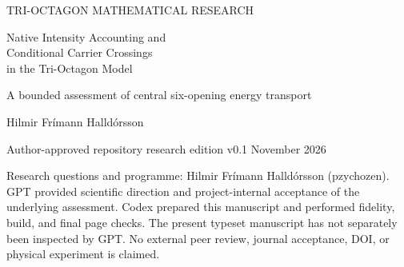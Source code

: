 \documentclass[11pt,a4paper]{article}
\numberwithin{equation}{section}
\theoremstyle{remark}\newtheorem{remark}[proposition]{Remark}
\begin{document}
\hypersetup{pageanchor=false}
\begin{titlepage}
\vspace*{6mm}
{\small\color{MidnightBlue} TRI-OCTAGON MATHEMATICAL RESEARCH\par}
\vspace{8mm}
{\LARGE\bfseries\raggedright Native Intensity Accounting and\\ Conditional Carrier Crossings\\ in the Tri-Octagon Model\par}
\vspace{6mm}
{\large A bounded assessment of central six-opening energy transport\par}
\vspace{7mm}
{\large Hilmir Fr\'imann Halld\'orsson\par}
\vspace{3mm}
{Author-approved repository research edition v0.1 November 2026\par}
\vspace{5mm}
\begin{abstract}
We consolidate an accepted analytical assessment of whether energy leaves the Tri-Octagon's central region through its three upper and three lower openings. The unchanged native triad admits exact component and total intensity balances. An antisymmetric channel-exchange representation coexists with graph mismatch and the complete finite-step square; it is neither unique from its divergence nor a spatial opening current. We retain the exact potential and synchronization accounts and the separately proved descent theorem on its specified coherent domain. A separately adopted periodic carrier, C1, has a genuine storage, signed source-work and local flux balance, together with an explicit conditional native-readout-to-two-drive map. Its registered circle crosses one pair of finite host-notch measurement triangles. Combining the existing tangents and normals gives signed cut powers and a short-arc storage balance. These cuts are not the six central broken opening boundaries. No reciprocal native debit for carrier work or six-opening transfer allocation is established. Phase reconstruction, staged observations and retained Z examples clarify what direction and placement data do and do not identify. The result is a positive conditional balance-and-crossing statement, not a demonstration of physical emission or a nonzero flowing trajectory.
\end{abstract}
\vfill
{\small Research questions and programme: Hilmir Fr\'imann Halld\'orsson (pzychozen).
GPT provided scientific direction and project-internal acceptance of the underlying assessment.
Codex prepared this manuscript and performed fidelity, build, and final page checks.
The present typeset manuscript has not separately been inspected by GPT.
No external peer review, journal acceptance, DOI, or physical experiment is claimed.}
\end{titlepage}
\setcounter{page}{2}\hypersetup{pageanchor=true}






\end{document}
